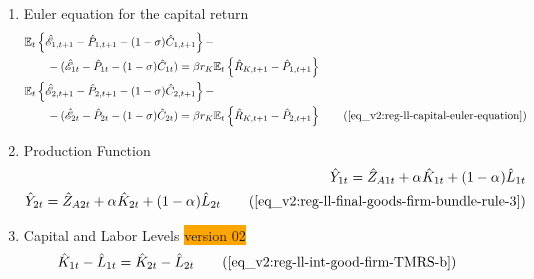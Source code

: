 \documentclass[../thesis.tex]{subfiles}
\begin{document}
{\begin{enumerate}
		\item Euler equation for the capital return
		\begin{alignat}{2}
			&\E \left\{ \hat{\mathscr{E}}_{1, t+1} - \hat{P}_{1, t+1}  - (1 -\sigma) \hat{C}_{1, t+1} \right\} - \nonumber \\ &\qquad - (\hat{\mathscr{E}}_{1 t} - \hat{P}_{1 t} - (1 -\sigma) \hat{C}_{1 t}) = \beta r_{K} \mathbb{E}_t \left\{ \hat{R}_{K, t+1} - \hat{P}_{1, t+1} \right\} \nonumber \\
			&\E \left\{ \hat{\mathscr{E}}_{2, t+1} - \hat{P}_{2, t+1}  - (1 -\sigma) \hat{C}_{2, t+1} \right\} - \nonumber \\ &\qquad - (\hat{\mathscr{E}}_{2 t} - \hat{P}_{2 t} - (1 -\sigma) \hat{C}_{2 t}) = \beta r_{K} \mathbb{E}_t \left\{ \hat{R}_{K, t+1} - \hat{P}_{2, t+1} \right\} \tag{\ref{eq_v2:reg-ll-capital-euler-equation}}
		\end{alignat}
		
		\item Production Function
		\begin{align}
			\hat{Y}_{1 t} = \hat{Z}_{A1 t} + {\alpha_{}} \hat{K}_{1 t} + (1-{\alpha_{}}) \hat{L}_{1 t} \nonumber \\
			\hat{Y}_{2 t} = \hat{Z}_{A2 t} + {\alpha_{}} \hat{K}_{2 t} + (1-{\alpha_{}}) \hat{L}_{2 t} \tag{\ref{eq_v2:reg-ll-final-goods-firm-bundle-rule-3}}
		\end{align}

		\item Capital and Labor Levels \colorbox{orange}{version 02}
		\begin{align}
			\hat{K}_{1t} - \hat{L}_{1t} &= \hat{K}_{2t} - \hat{L}_{2t} \tag{\ref{eq_v2:reg-ll-int-good-firm-TMRS-b}}
		\end{align}


\begin{comment}
	
		\item Marginal Rates of Substitution of Factors
\begin{align}
	\hat{K}_{1 t} - \hat{L}_{1 t} = \hat{W}_{t} - \hat{R}_{K t} \nonumber \\
	\hat{K}_{2 t} - \hat{L}_{2 t} = \hat{W}_{t} - \hat{R}_{K t} \tag{\ref{eq_v2:reg-ll-int-good-firm-TMRS}}
\end{align}	
	
\end{comment}
		

\end{enumerate}}
\end{document}
